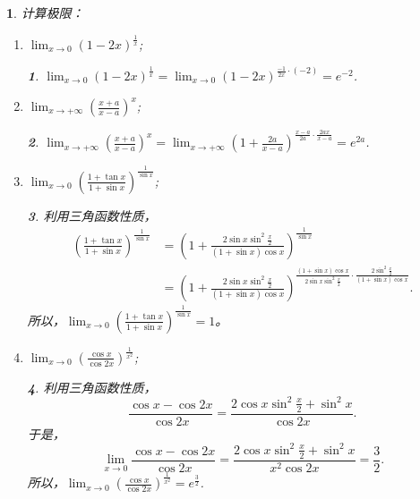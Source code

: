 \documentclass[utf8]{book}
\newtheorem{example}{}[section]             %
\newtheorem{solution}{}
\begin{document}
\begin{example}
计算极限：
\renewcommand\labelenumi{\normalfont(\theenumi)}
\begin{enumerate}
\item $\displaystyle\lim_{x\to 0}(1-2x)^{\frac{1}{x}}$;
\begin{solution}
$\displaystyle\lim_{x\to 0}(1-2x)^{\frac{1}{x}}=\displaystyle\lim_{x\to 0}(1-2x)^{\frac{-1}{2x}\cdot(-2)}=e^{-2}$.
\end{solution}
\item $\displaystyle\lim_{x\to +\infty}\left(\frac{x+a}{x-a}\right)^x$;
\begin{solution}
$\displaystyle\lim_{x\to +\infty}\left(\frac{x+a}{x-a}\right)^x=\displaystyle\lim_{x\to +\infty}\left(1+\frac{2a}{x-a}\right)^{\frac{x-a}{2a}\cdot\frac{2ax}{x-a}}=e^{2a}$.
\end{solution}
\item $\displaystyle\lim_{x\to 0}\left(\frac{1+\tan{x}}{1+\sin{x}}\right)^{\frac{1}{\sin{x}}}$;
\begin{solution}利用三角函数性质，
\begin{equation*}
\begin{split}
\left(\frac{1+\tan{x}}{1+\sin{x}}\right)^{\frac{1}{\sin{x}}}&=\left(1+\frac{2\sin{x}\sin^2{\frac{x}{2}}}{(1+\sin{x})\cos{x}}\right)^{\frac{1}{\sin{x}}}\\&=
\left(1+\frac{2\sin{x}\sin^2{\frac{x}{2}}}{(1+\sin{x})\cos{x}}\right)^{\displaystyle\frac{(1+\sin{x})\cos{x}}{2\sin{x}\sin^2{\frac{x}{2}}}\cdot\frac{2\sin^2{\frac{x}{2}}}{(1+\sin{x})\cos{x}}}.
\end{split}
\end{equation*}
所以，$\displaystyle\lim_{x\to 0}\left(\frac{1+\tan{x}}{1+\sin{x}}\right)^{\frac{1}{\sin{x}}}=1$。
\end{solution}
\item $\displaystyle\lim_{x\to 0}\left(\frac{\cos{x}}{\cos{2x}}\right)^{\frac{1}{x^2}}$;
\begin{solution}利用三角函数性质，
$$\displaystyle\frac{\cos{x}-\cos{2x}}{\cos{2x}}=\displaystyle\frac{2\cos{x}\sin^2{\frac{x}{2}}+\sin^2{x}}{\cos{2x}}.$$
于是，
$$\displaystyle\lim_{x\to 0}\displaystyle\frac{\cos{x}-\cos{2x}}{\cos{2x}}=\displaystyle\frac{2\cos{x}\sin^2{\frac{x}{2}}+\sin^2{x}}{x^2\cos{2x}}=\frac{3}{2}.$$
所以，$\displaystyle\lim_{x\to 0}\left(\frac{\cos{x}}{\cos{2x}}\right)^{\frac{1}{x^2}}=e^{\frac{3}{2}}$.
\end{solution}
\end{enumerate}
\end{example}
\end{document}
